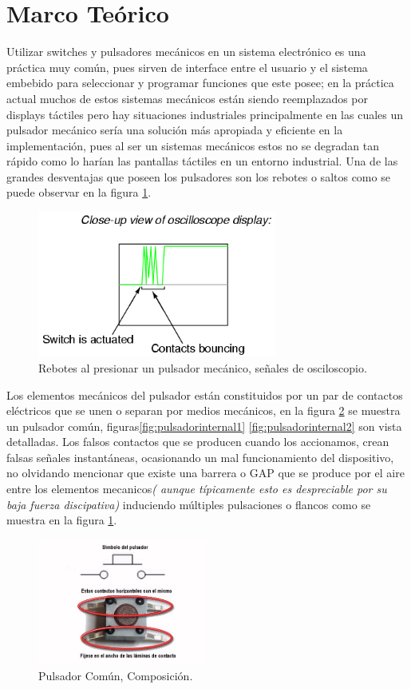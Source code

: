 \documentclass[paper=a4, fontsize=12pt]{article} 		%
\numberwithin{equation}{section}						%
\numberwithin{table}{section} 							%
\begin{document}
\section{Marco Teórico}
\label{sec:problemamecanico}
Utilizar switches y pulsadores mecánicos en un sistema electrónico es una práctica muy común, pues sirven de interface entre el usuario y el sistema embebido para seleccionar y programar funciones que este posee; en la práctica actual muchos de estos sistemas mecánicos están siendo reemplazados por displays táctiles pero hay situaciones industriales principalmente en las cuales un pulsador mecánico sería una solución más apropiada y eficiente en la implementación, pues al ser un sistemas mecánicos estos no se degradan tan rápido como lo harían las pantallas táctiles en un entorno industrial. Una de las grandes desventajas que poseen los pulsadores son los rebotes o saltos como se puede observar en la figura \ref{fig:debounce}.\\
\begin{figure}[H]
  \centering
     \includegraphics[width=0.7\textwidth]{debounce}
  \caption{Rebotes al presionar un pulsador mecánico, señales de osciloscopio.}
      \label{fig:debounce}
\end{figure}
Los elementos mecánicos del pulsador están constituidos por un par de contactos eléctricos que se unen o separan por medios mecánicos,  en la figura \ref{fig:pulsador} se muestra un pulsador común, figuras\ref{fig:pulsadorinternal1} \ref{fig:pulsadorinternal2} son vista detalladas. Los falsos contactos que se producen cuando los accionamos, crean falsas señales instantáneas, ocasionando un mal funcionamiento del dispositivo, no olvidando mencionar que existe una barrera o GAP que se produce por el aire entre los elementos mecanicos\textit{( aunque típicamente esto es despreciable por su baja fuerza discipativa)} induciendo múltiples pulsaciones o flancos como se muestra en la figura \ref{fig:debounce}. 
\begin{figure}[H]
  \centering
     \includegraphics[width=0.5\textwidth]{pulsador}
  \caption{Pulsador Común, Composición.}
      \label{fig:pulsador}
\end{figure}
\end{document}
